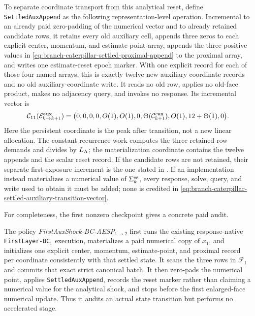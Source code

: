 To separate coordinate transport from this analytical reset, define
\texttt{SettledAuxAppend} as the following representation-level operation.
Incremental to an already paid zero-padding of the numerical vector and to
already retained candidate rows, it retains every old auxiliary cell,
appends three zeros to each explicit center, momentum, and estimate-point
array, appends the three positive values in
\cref{eq:branch-caterpillar-settled-proximal-append} to the proximal array,
and writes one estimate-reset epoch marker.  With one explicit record for
each of those four named arrays, this is exactly twelve new auxiliary
coordinate records and no old auxiliary-coordinate write.  It reads no old
row, applies no old-face product, makes no adjacency query, and invokes no
response.  Its incremental vector is
\begin{equation}
 \mathcal C_{11}(\mathcal E_{k\to k+1}^{\rm aux})=
 \bigl(0,0,0,0,O(1),O(1),0,
 \Theta(\mathcal C_{k+1}^{\rm can}),O(1),12+\Theta(1),0\bigr).
 \label{eq:branch-caterpillar-settled-auxiliary-transition-vector}
\end{equation}
Here the persistent coordinate is the peak after transition, not a new
linear allocation.  The constant recurrence work computes the three
retained-row demands and divides by $L_{\rm A}$; the materialization
coordinate contains the twelve appends and the scalar reset record.  If the
candidate rows are not retained, their separate first-exposure increment is
the one stated in
.  If an
implementation instead materializes a numerical value of
$\Sigma_k^{\rm es}$, every response, solve, query, and write used to obtain it
must be added; none is credited in
\cref{eq:branch-caterpillar-settled-auxiliary-transition-vector}.

For completeness, the first nonzero checkpoint gives a concrete paid audit.

\noindent
The policy \emph{FirstAuxShock-BC-AESP}$_{1\to2}$ first runs the existing
response-native \texttt{FirstLayer-BC}$_1$ execution, materializes a paid
numerical copy of $x_1$, and initializes one explicit center, momentum,
estimate-point, and proximal record per coordinate consistently with that
settled state.  It scans the three rows in $\mathcal F_1$ and commits that
exact strict canonical batch.  It then zero-pads the numerical point, applies
\texttt{SettledAuxAppend}, records the reset marker rather than
claiming a numerical value for the analytical shock, and stops before the
first enlarged-face numerical update.  Thus it audits an actual state
transition but performs no accelerated stage.

